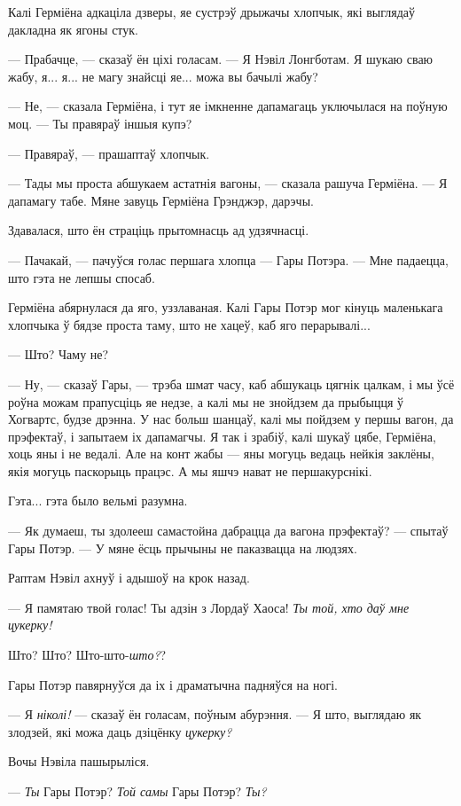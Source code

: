 Калі Герміёна адкаціла дзверы, яе сустрэў дрыжачы хлопчык, які выглядаў 
дакладна як ягоны стук.

--- Прабачце, --- сказаў ён ціхі голасам. --- Я Нэвіл Лонгботам. Я шукаю сваю 
жабу, я... я... не магу знайсці яе... можа вы бачылі жабу?

--- Не, --- сказала Герміёна, і тут яе імкненне дапамагаць уключылася на поўную
моц. --- Ты правяраў іншыя купэ?

--- Правяраў, --- прашаптаў хлопчык.

--- Тады мы проста абшукаем астатнія вагоны, --- сказала рашуча Герміёна. --- 
Я дапамагу табе. Мяне завуць Герміёна Грэнджэр, дарэчы.

Здавалася, што ён страціць прытомнасць ад удзячнасці.

--- Пачакай, --- пачуўся голас першага хлопца --- Гары Потэра. --- Мне 
падаецца, што гэта не лепшы спосаб.

Герміёна абярнулася да яго, уззлаваная. Калі Гары Потэр мог кінуць 
маленькага хлопчыка ў бядзе проста таму, што не хацеў, каб яго перарывалі...

--- Што? Чаму не?

--- Ну, --- сказаў Гары, --- трэба шмат часу, каб абшукаць цягнік цалкам, і мы 
ўсё роўна можам прапусціць яе недзе, а калі мы не знойдзем да прыбыцця ў 
Хогвартс, будзе дрэнна. У нас больш шанцаў, калі мы пойдзем у першы вагон,
да прэфектаў, і запытаем іх дапамагчы. Я так і зрабіў, калі шукаў цябе, Герміёна,
хоць яны і не ведалі. Але на конт жабы --- яны могуць ведаць нейкія заклёны, якія
могуць паскорыць працэс. А мы яшчэ нават не першакурснікі.

Гэта... гэта было вельмі разумна.

--- Як думаеш, ты здолееш самастойна дабрацца да вагона прэфектаў? --- спытаў 
Гары Потэр. --- У мяне ёсць прычыны не паказвацца на людзях.

Раптам Нэвіл ахнуў і адышоў на крок назад. 

--- Я памятаю твой голас! Ты адзін з Лордаў Хаоса!  \emph{Ты той, хто даў мне цукерку!}

Што? Што? Што-што-\emph{што?}? 

Гары Потэр павярнуўся да іх і драматычна падняўся на ногі. 

--- Я \emph{ніколі!} --- сказаў ён голасам, поўным абурэння. --- Я што, 
выглядаю як злодзей, які можа даць дзіцёнку \emph{цукерку?} 

Вочы Нэвіла пашырыліся. 

--- \emph{Ты} Гары Потэр? \emph{Той самы} Гары Потэр? \emph{Ты?}

